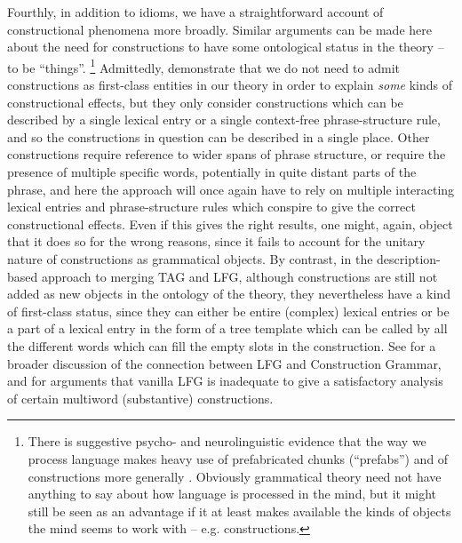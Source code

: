 \documentclass[output=paper,hidelinks]{langscibook}
\begin{document}
Fourthly, in addition to idioms, we have a straightforward account of constructional
phenomena more broadly. Similar arguments can be made here about the need for
constructions to have some ontological status in the theory -- to be ``things''.%
%
\footnote{There is suggestive psycho- and neurolinguistic evidence that the way
  we process language makes heavy use of prefabricated chunks (``prefabs'')
  \citep{pawley:puzzles,wray:formulaic} and of constructions more generally
  \citep{bencini:constructions,kaschak:constructing,goldwater:constructional,pulvermuller:embodiment,allen:fmri-constructions,johnson:jabberwocky}.
  Obviously grammatical theory need not have anything to say about how language
  is processed in the mind, but it might still be seen as an advantage if it at
  least makes available the kinds of objects the mind seems to work with -- e.g.
  constructions.}
%
Admittedly, \citet{asudeh2013constructions} demonstrate that we do not need to
admit constructions as first-class entities in our theory in order to explain
\emph{some} kinds of constructional effects, but they only consider
constructions which can be described by a single lexical entry or a single
context-free phrase-structure rule, and so the constructions in question can be
described in a single place. Other constructions require reference to wider
spans of phrase structure, or require the presence of multiple specific words,
potentially in quite distant parts of the phrase, and here the approach will
once again have to rely on multiple interacting lexical entries and
phrase-structure rules which conspire to give the correct constructional
effects. Even if this gives the right results, one might, again, object that it
does so for the wrong reasons, since it fails to account for the unitary nature
of constructions as grammatical objects. By contrast, in the description-based
approach to merging TAG and LFG, although constructions are still not added as
new objects in the ontology of the theory, they nevertheless have a kind of
first-class status, since they can either be entire (complex) lexical entries or
be a part of a lexical entry in the form of a tree template which can be called
by all the different words which can fill the empty slots in the construction.
See \citet{findlay:lfg-as-cxg} for a broader discussion of the connection
between LFG and Construction Grammar, and for arguments that vanilla LFG is
inadequate to give a satisfactory analysis of certain multiword (substantive)
constructions.

\end{document}
